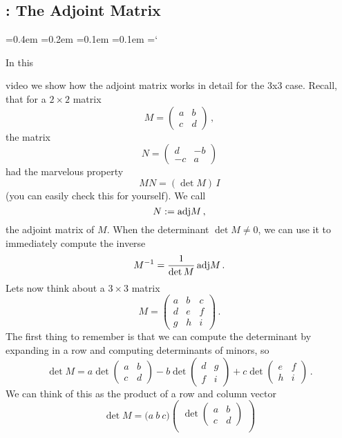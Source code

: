 
\subsection{ \propDetTitle: The Adjoint Matrix}

{\ttfamily
{}\font=0.4em
\font=0.2em
\font=0.1em
\font=0.1em
\hyphenchar\font=`\-





\hypertarget{video_properties_of_determinant_adjoint}{In this} video we show how the adjoint 
matrix works in detail for the 3x3 case. Recall, that for a $2\times 2$ matrix
$$
M=\begin{pmatrix}a&b\\c&d\end{pmatrix}\, ,
$$
the matrix
$$
N=\begin{pmatrix}d&-b\\ -c & a\end{pmatrix}
$$
had the marvelous property
$$
MN=(\det M)\, I
$$
(you can easily check this for yourself). We call $$N:={\rm adj} M\, ,$$ the 
adjoint matrix of $M$. When the determinant $\det M\neq 0$, we can use it to immediately compute the inverse
$$
M^{-1}=\frac{1}{\det M}\, {\rm adj}M\, .
$$
Lets now think about a $3\times 3$ matrix 
$$
M=\begin{pmatrix}
a &b&c\\d&e&f\\g&h&i\end{pmatrix}\, .
$$
The first thing to remember is that we can compute the determinant by expanding in a row and computing determinants of minors, so
$$
\det M = a \det\begin{pmatrix}a&b\\c&d\end{pmatrix}
-b\det\begin{pmatrix}d&g\\f&i\end{pmatrix}
+c\det\begin{pmatrix}e&f\\h&i\end{pmatrix}\, .
$$
We can think of this as the product of a row and column vector
$$
\det M = \Big( a \ b \ c \Big)
\begin{pmatrix} \det\begin{pmatrix}a&b\\c&d\end{pmatrix}\\[2mm]

\end{pmatrix}$$}

